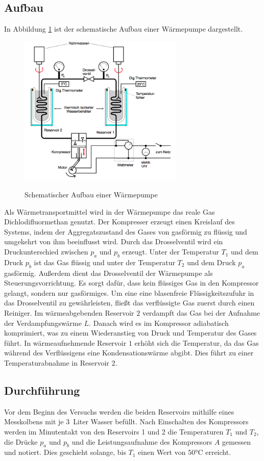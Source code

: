 \subsection{Aufbau}
In Abbildung \ref{fig:aufbau} ist der schematische Aufbau einer Wärmepumpe dargestellt.
\begin{figure}
\centering
\includegraphics[width=0.7\textwidth]{aufbau.png}
\caption{Schematischer Aufbau einer Wärmepumpe}\cite{on1}
\label{fig:aufbau}
\end{figure}
\newline
Als Wärmetransportmittel wird in der Wärmepumpe das reale Gas Dichlodifluormethan genutzt.
Der Kompresser erzeugt einen Kreislauf des Systems, indem der Aggregatszustand des Gases
von gasförmig zu flüssig und umgekehrt von ihm beeinflusst wird.
\newline
Durch das Drosselventil wird ein Druckunterschied zwischen $p_a$ und $p_b$ erzeugt.
Unter der Temperatur $T_1$ und dem Druck $p_b$ ist das Gas flüssig und unter der Temperatur $T_2$
und dem Druck $p_a$ gasförmig. Außerdem dient das Drosselventil der Wärmepumpe als Steuerungsvorrichtung.
Es sorgt dafür, dass kein flüssiges Gas in den Kompressor gelangt, sondern nur gasförmiges.
Um eine eine blasenfreie Flüssigkeitszufuhr in das Drosselventil zu gewährleisten, fließt
das verflüssigte Gas zuerst durch einen Reiniger.
\newline
Im wärmeabgebenden Reservoir $2$ verdampft das Gas bei der Aufnahme der Verdampfungswärme $L$.
Danach wird es im Kompressor adiabatisch komprimiert, was zu einem Wiederanstieg von Druck und Temperatur des Gases führt.
In wärmeaufnehmende Reservoir $1$ erhöht sich die Temperatur, da das Gas während des Verflüssigens eine Kondensationswärme
abgibt. Dies führt zu einer Temperaturabnahme in Reservoir $2$.

\subsection{Durchführung}
Vor dem Beginn des Versuchs werden die beiden Reservoirs mithilfe eines Messkolbens mit je $3$\, Liter
Wasser befüllt. Nach Einschalten des Kompressors werden im Minutentakt von den Reservoirs 1 und 2 die
Temperaturen $T_1$ und $T_2$, die Drücke $p_a$ und $p_b$ und die Leistungsaufnahme des Kompressors $A$
gemessen und notiert. Dies geschieht solange, bis $T_1$ einen Wert von $50\si{\degreeCelsius}$ erreicht.
